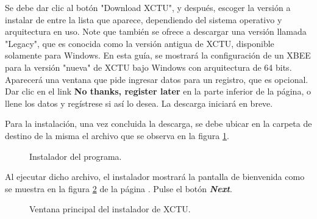 Se debe dar clic al botón "Download XCTU", y después, escoger la versión a instalar de entre la lista que aparece, dependiendo del sistema operativo y arquitectura en uso. Note que también se ofrece a descargar una versión llamada "Legacy", que es conocida como la versión antigua de XCTU, disponible solamente para Windows. En esta guía, se mostrará la configuración de un XBEE para la versión "nueva" de XCTU bajo Windows con arquitectura de 64 bits. Aparecerá una ventana que pide ingresar datos para un registro, que es opcional. Dar clic en el link \textbf{No thanks, register later} en la parte inferior de la página, o llene los datos y regístrese si así lo desea. La descarga iniciará en breve.

Para la instalación, una vez concluida la descarga, se debe ubicar en la carpeta de destino de la misma el archivo que se observa en la figura \ref{fig:Dest}. 

\begin{figure}[H] %
\caption{Instalador del programa.}
\label{fig:Dest}
\end{figure}

Al ejecutar dicho archivo, el instalador mostrará la pantalla de bienvenida como se muestra en la figura \ref{fig:HXctu} de la página \pageref{fig:HXctu}. Pulse el botón \textit{\textbf{Next}}.

\begin{figure}[H] %
\caption{Ventana principal del instalador de XCTU.}
\label{fig:HXctu}
\end{figure}

